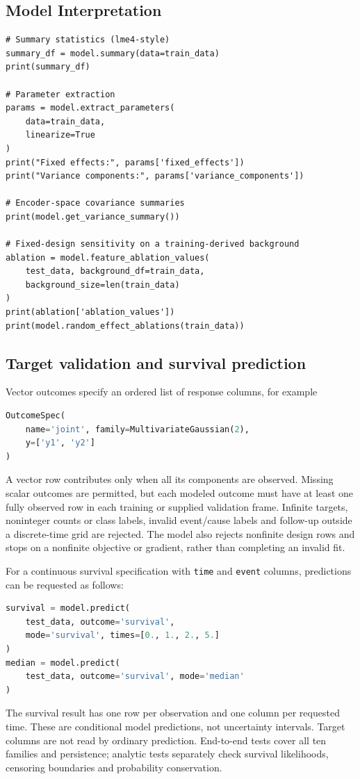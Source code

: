 \documentclass[12pt,a4paper]{article}
\begin{document}
\subsection{Model Interpretation}

\begin{lstlisting}
# Summary statistics (lme4-style)
summary_df = model.summary(data=train_data)
print(summary_df)

# Parameter extraction
params = model.extract_parameters(
    data=train_data,
    linearize=True
)
print("Fixed effects:", params['fixed_effects'])
print("Variance components:", params['variance_components'])

# Encoder-space covariance summaries
print(model.get_variance_summary())

# Fixed-design sensitivity on a training-derived background
ablation = model.feature_ablation_values(
    test_data, background_df=train_data,
    background_size=len(train_data)
)
print(ablation['ablation_values'])
print(model.random_effect_ablations(train_data))
\end{lstlisting}

\subsection{Target validation and survival prediction}
Vector outcomes specify an ordered list of response columns, for example
\begin{lstlisting}[language=Python]
OutcomeSpec(
    name='joint', family=MultivariateGaussian(2),
    y=['y1', 'y2']
)
\end{lstlisting}
A vector row contributes only when all its components are observed. Missing
scalar outcomes are permitted, but each modeled outcome must have at least
one fully observed row in each training or supplied validation frame. Infinite
targets, noninteger counts or class labels, invalid event/cause labels and
follow-up outside a discrete-time grid are rejected. The model also rejects
nonfinite design rows and stops on a nonfinite objective or gradient, rather
than completing an invalid fit.

For a continuous survival specification with \texttt{time} and \texttt{event}
columns, predictions can be requested as follows:
\begin{lstlisting}[language=Python]
survival = model.predict(
    test_data, outcome='survival',
    mode='survival', times=[0., 1., 2., 5.]
)
median = model.predict(
    test_data, outcome='survival', mode='median'
)
\end{lstlisting}
The survival result has one row per observation and one column per requested
time. These are conditional model predictions, not uncertainty intervals.
Target columns are not read by ordinary prediction. End-to-end tests cover
all ten families and persistence; analytic tests separately check survival
likelihoods, censoring boundaries and probability conservation.
\end{document}

